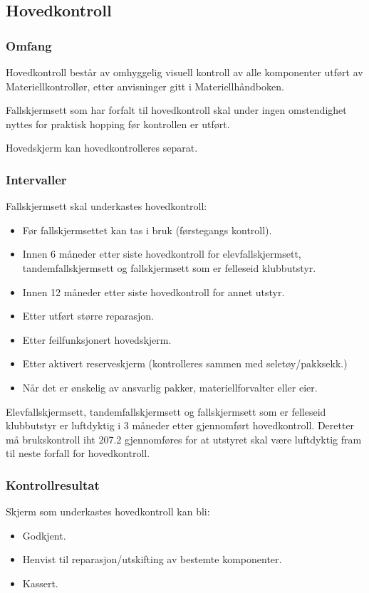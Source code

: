 \subsection{Hovedkontroll}
\subsubsection{Omfang}
Hovedkontroll består av omhyggelig visuell kontroll av alle komponenter utført av Materiellkontrollør, etter anvisninger gitt i Materiellhåndboken.

Fallskjermsett som har forfalt til hovedkontroll skal under ingen omstendighet nyttes for praktisk hopping før kontrollen er utført.

Hovedskjerm kan hovedkontrolleres separat.

\subsubsection{Intervaller}
Fallskjermsett skal underkastes hovedkontroll:
\begin{itemize}
	\item Før fallskjermsettet kan tas i bruk (førstegangs kontroll).
	\item Innen 6 måneder etter siste hovedkontroll for elevfallskjermsett, tandemfallskjermsett og fallskjermsett som er felleseid klubbutstyr.
	\item Innen 12 måneder etter siste hovedkontroll for annet utstyr.
	\item Etter utført større reparasjon.
	\item Etter feilfunksjonert hovedskjerm.
	\item Etter aktivert reserveskjerm (kontrolleres sammen med seletøy/pakksekk.)
	\item Når det er ønskelig av ansvarlig pakker, materiellforvalter eller eier.
\end{itemize}

Elevfallskjermsett, tandemfallskjermsett og fallskjermsett som er felleseid klubbutstyr er luftdyktig i 3 måneder etter gjennomført hovedkontroll. Deretter må brukskontroll iht 207.2 gjennomføres for at utstyret skal være luftdyktig fram til neste forfall for hovedkontroll.

\subsubsection{Kontrollresultat}
Skjerm som underkastes hovedkontroll kan bli:
\begin{itemize}
	\item Godkjent.
	\item Henvist til reparasjon/utskifting av bestemte komponenter.
	\item Kassert.
\end{itemize}

